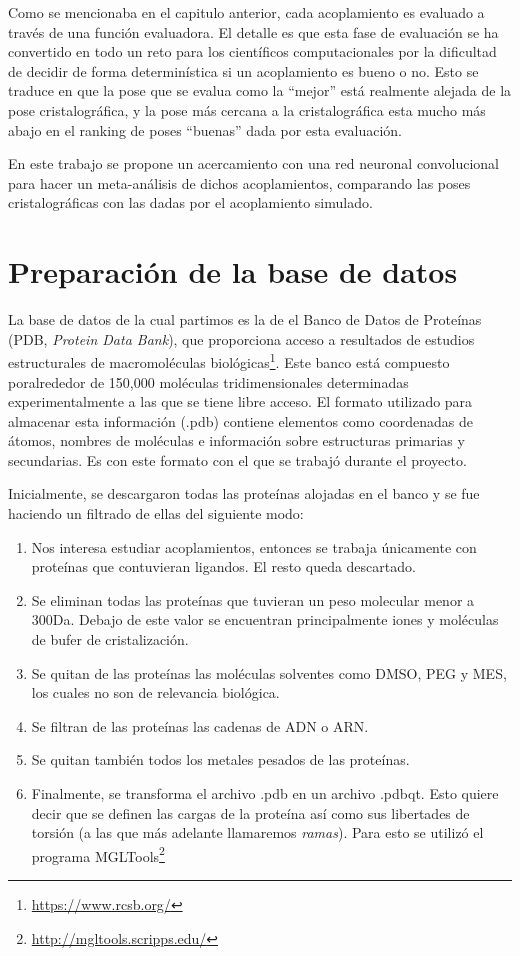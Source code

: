 Como se mencionaba en el capitulo anterior, cada acoplamiento es
evaluado a través de una función evaluadora. El detalle es que esta
fase de evaluación se ha convertido en todo un reto para los
científicos computacionales por la dificultad de decidir de forma
determinística si un acoplamiento es bueno o no. Esto se traduce en
que la pose que se evalua como la ``mejor'' está realmente alejada de
la pose cristalográfica, y la pose más cercana a la cristalográfica
esta mucho más abajo en el ranking de poses ``buenas'' dada por esta
evaluación.

En este trabajo se propone un acercamiento con una red neuronal
convolucional para hacer un meta-análisis de dichos acoplamientos,
comparando las poses cristalográficas con las dadas por el acoplamiento
simulado.

\section{Preparación de la base de datos}
La base de datos de la cual partimos es la de el Banco de Datos de
Proteínas (PDB, \textit{Protein Data Bank}), que proporciona acceso a
resultados de estudios estructurales de macromoléculas
biológicas\footnote{\url{https://www.rcsb.org/}}. Este banco está
compuesto poralrededor de 150,000 moléculas tridimensionales
determinadas experimentalmente a las que se tiene libre acceso. El
formato utilizado para almacenar esta información (.pdb) contiene
elementos como coordenadas de átomos, nombres de moléculas e
información sobre estructuras primarias y secundarias. Es con este
formato con el que se trabajó durante el proyecto.

Inicialmente, se descargaron todas las proteínas alojadas en el banco
y se fue haciendo un filtrado de ellas del siguiente modo:
\begin{enumerate}
  \item Nos interesa estudiar acoplamientos, entonces se trabaja únicamente
  con proteínas que contuvieran ligandos. El resto queda descartado.
  \item Se eliminan todas las proteínas que tuvieran un peso
    molecular menor a 300Da. Debajo de este valor se encuentran
    principalmente iones y moléculas de bufer de cristalización.
  \item Se quitan de las proteínas las moléculas solventes
  como DMSO, PEG y MES, los cuales no son de relevancia biológica.\@
  \item Se filtran de las proteínas las cadenas de ADN o ARN.\@
  \item Se quitan también todos los metales pesados de las proteínas.
  \item Finalmente, se transforma el archivo .pdb en un archivo .pdbqt.
  Esto quiere decir que se definen las cargas de la proteína así como
  sus libertades de torsión (a las que más adelante
  llamaremos \textit{ramas}). Para esto se utilizó el programa
  MGLTools\footnote{\url{http://mgltools.scripps.edu/}}
\end{enumerate}

